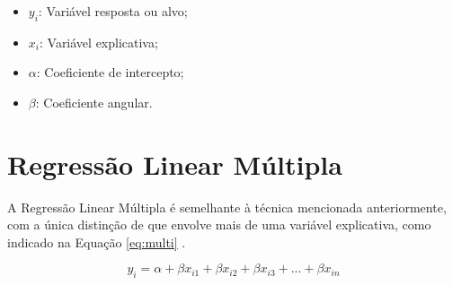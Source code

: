 \begin{itemize}
  \item $y_{i}$: Variável resposta ou alvo;
  \item $x_{i}$: Variável explicativa;
  \item $\alpha$: Coeficiente de intercepto;
  \item $\beta$: Coeficiente angular.
\end{itemize}

\section{Regressão Linear Múltipla}
A Regressão Linear Múltipla é semelhante à técnica mencionada anteriormente, com a única distinção de
que envolve mais de uma variável explicativa, como indicado na Equação \ref{eq:multi} \cite{Almeida_Carvalho_Menino}.

\begin{equation}
  y_{i} = \alpha + \beta x_{i1} + \beta x_{i2} + \beta x_{i3} + ... + \beta x_{in}
  \label{eq:multi}
\end{equation}